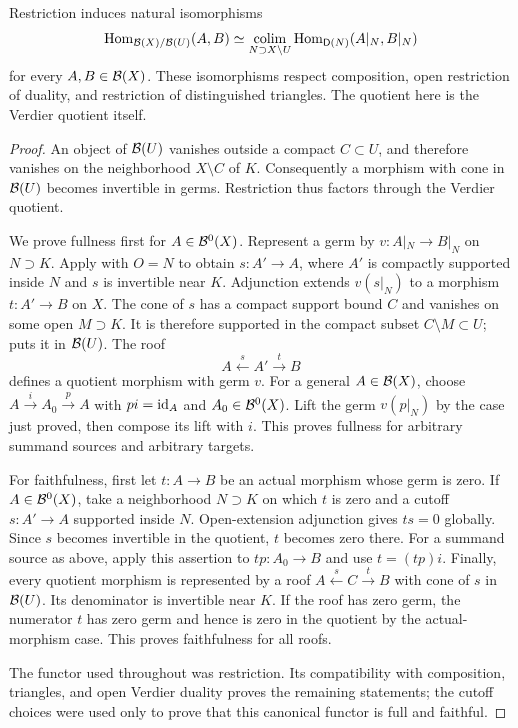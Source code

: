 \begin{theorem}
\label{thm:germs}
Restriction induces natural isomorphisms
\[
 \operatorname{Hom}_{\mathcal B(X)/\mathcal B(U)}(A,B)
 \simeq
 \operatorname*{colim}_{N\supset X\setminus U}
 \operatorname{Hom}_{\mathsf D(N)}(A|_N,B|_N)
\]
for every $A,B\in\mathcal B(X)$.  These isomorphisms respect composition,
open restriction of duality, and restriction of distinguished triangles.
The quotient here is the Verdier quotient itself.
\end{theorem}

\begin{proof}
An object of $\mathcal B(U)$ vanishes outside a compact $C\subset U$, and
therefore vanishes on the neighborhood $X\setminus C$ of $K$.
Consequently a morphism with cone in $\mathcal B(U)$ becomes invertible in
germs.  Restriction thus factors through the Verdier quotient.

We prove fullness first for $A\in\mathcal B^0(X)$.  Represent a germ by
$v:A|_N\to B|_N$ on $N\supset K$.  Apply  with
$O=N$ to obtain $s:A'\to A$, where $A'$ is compactly supported inside
$N$ and $s$ is invertible near $K$.  Adjunction extends
$v(s|_N)$ to a morphism $t:A'\to B$ on $X$.  The cone of $s$ has a
compact support bound $C$ and vanishes on some open $M\supset K$.
It is therefore supported in the compact subset $C\setminus M\subset U$;
 puts it in $\mathcal B(U)$.  The roof
\[
 A\xleftarrow{s}A'\xrightarrow{t}B
\]
defines a quotient morphism with germ $v$.
For a general $A\in\mathcal B(X)$, choose
$A\xrightarrow{i}A_0\xrightarrow{p}A$ with $pi=\mathrm{id}_A$ and
$A_0\in\mathcal B^0(X)$.  Lift the germ $v(p|_N)$ by the case just proved,
then compose its lift with $i$.  This proves fullness for arbitrary
summand sources and arbitrary targets.

For faithfulness, first let $t:A\to B$ be an actual morphism whose germ
is zero.  If $A\in\mathcal B^0(X)$, take a neighborhood $N\supset K$ on
which $t$ is zero and a cutoff $s:A'\to A$ supported inside $N$.
Open-extension adjunction gives $ts=0$ globally.  Since $s$ becomes
invertible in the quotient, $t$ becomes zero there.  For a summand source
as above, apply this assertion to $tp:A_0\to B$ and use $t=(tp)i$.
Finally, every quotient morphism is represented by a roof
$A\xleftarrow{s}C\xrightarrow{t}B$ with cone of $s$ in $\mathcal B(U)$.
Its denominator is invertible near $K$.  If the roof has zero germ,
the numerator $t$ has zero germ and hence is zero in the quotient by
the actual-morphism case.  This proves faithfulness for all roofs.

The functor used throughout was restriction.  Its compatibility with
composition, triangles, and open Verdier duality proves the remaining
statements; the cutoff choices were used only to prove that this
canonical functor is full and faithful.
\end{proof}

